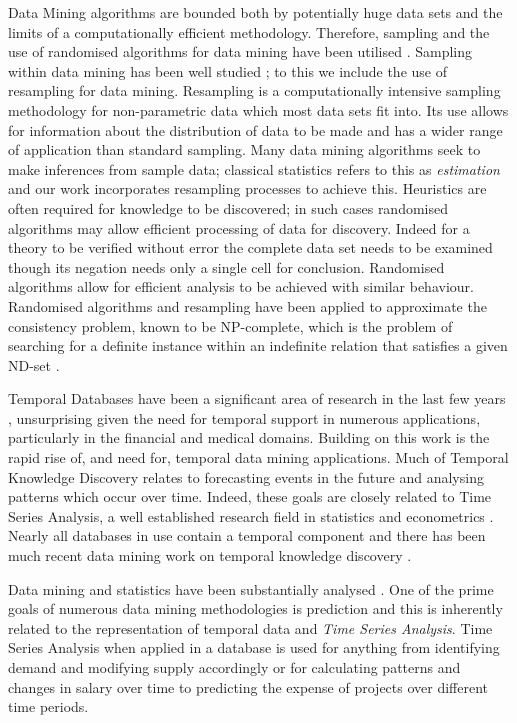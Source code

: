 Data Mining algorithms are bounded both by potentially huge data sets
and the limits of a computationally efficient methodology. Therefore,
sampling and the use of randomised algorithms for data mining have
been utilised \cite{km94,gms97,cl98b}. Sampling within data mining has
been well studied \cite{km94,jl96}; to this we include the use of
resampling for data mining. Resampling is a computationally intensive
sampling methodology for non-parametric data which most data sets fit
into. Its use allows for information about the distribution of data to
be made and has a wider range of application than standard
sampling. Many data mining algorithms seek to make inferences from
sample data; classical statistics refers to this as {\em estimation}
and our work incorporates resampling processes \cite{efro79,et86,et93}
to achieve this. Heuristics are often required for knowledge to be
discovered;
in such cases randomised algorithms may allow efficient processing of
data for discovery. Indeed for a theory to be verified without error
the complete data set needs to be examined though its negation needs
only a single cell for conclusion. Randomised algorithms allow for
efficient analysis to be achieved with similar behaviour. Randomised
algorithms and resampling have been applied to approximate the
consistency problem, known to be NP-complete, which is the problem of
searching for a definite instance within an indefinite relation that
satisfies a given ND-set \cite{vn95,cl98,cl98b}.

\medskip

Temporal
Databases have been a significant area of research in the last few
years \cite{tcg93,ct95}, unsurprising given the need for temporal
support in numerous applications, particularly in the financial and
medical domains. Building on this work is the rapid rise of, and need
for, temporal data mining applications.  
Much of Temporal Knowledge Discovery relates to forecasting events in the
future and analysing 
patterns which occur over time. Indeed, these goals are closely
related to Time Series Analysis, a well established research field in
statistics and econometrics \cite{end95,naze88}. Nearly all databases
in use contain a 
temporal component and there has been much recent data  mining work on
temporal knowledge discovery \cite{alss95,pt96,bc96,bt98}. 

\medskip

Data mining and statistics have been substantially analysed
\cite{fhs96,gmp97}. One of the prime goals of numerous data mining
methodologies is prediction and this is inherently related to the
representation of temporal data and {\em Time Series Analysis}. Time
Series Analysis when applied in a 
 database is used for anything from identifying demand and modifying
supply accordingly or for calculating patterns and changes in salary over time
to predicting the expense of projects over different time periods.

